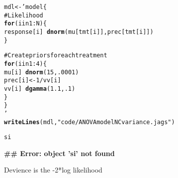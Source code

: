 \documentclass[12pt,letterpaper,oneside]{article}\usepackage{graphicx, color}
\makeatletter
\newcommand{\hlfunctioncall}[1]{\textcolor[rgb]{0.501960784313725,0,0.329411764705882}{\textbf{#1}}}%
\newcommand{\hlstring}[1]{\textcolor[rgb]{0.6,0.6,1}{#1}}%
\newcommand{\hlcomment}[1]{\textcolor[rgb]{0.180392156862745,0.6,0.341176470588235}{#1}}%
\newenvironment{kframe}{%
 \def\at@end@of@kframe{}%
 \ifinner\ifhmode%
  \def\at@end@of@kframe{\end{minipage}}%
  \begin{minipage}{\columnwidth}%
 \fi\fi%
 \def\FrameCommand##1{\hskip\@totalleftmargin \hskip-\fboxsep
 \colorbox{shadecolor}{##1}\hskip-\fboxsep
     \hskip-\linewidth \hskip-\@totalleftmargin \hskip\columnwidth}%
 \MakeFramed {\advance\hsize-\width
   \@totalleftmargin\z@ \linewidth\hsize
   \@setminipage}}%
 {\par\unskip\endMakeFramed%
 \at@end@of@kframe}
\newenvironment{knitrout}{}{} %
\makeatother
\begin{document}
\begin{knitrout}
{}



\end{knitrout}


\begin{knitrout}\scriptsize
{}\color{fgcolor}\begin{kframe}
\begin{alltt}
mdl <- 'model \{
\hlcomment{    # Likelihood}
    \hlfunctioncall{for} (i in 1:N)\{
        response[i] ~ \hlfunctioncall{dnorm}(mu[tmt[i]], prec[tmt[i]])
    \}

\hlcomment{    # Create priors for each treatment}
    \hlfunctioncall{for}(i in 1:4)\{
        mu[i] ~ \hlfunctioncall{dnorm}(15,.0001)
        prec[i] <- 1/vv[i]
        vv[i] ~ \hlfunctioncall{dgamma}(1.1,.1)
    \}
\}
'
\hlfunctioncall{writeLines}(mdl, \hlstring{"code/ANOVAmodelNCvariance.jags"})
\end{alltt}
\end{kframe}
\end{knitrout}

\begin{knitrout}\scriptsize
{}\color{fgcolor}\begin{kframe}
\begin{alltt}
si
\end{alltt}


{\ttfamily\noindent\bfseries\textcolor{errorcolor}{\#\# Error: object 'si' not found}}\end{kframe}
\end{knitrout}


Devience is the -2*log likelihood
\end{document}
